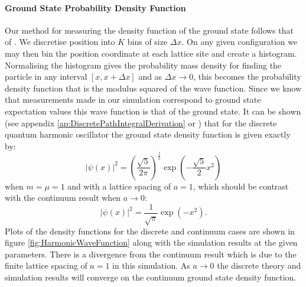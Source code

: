 \documentclass[12pt]{article}
\begin{document}
            \paragraph{Ground State Probability Density Function}
            Our method for measuring the density function of the ground state follows that of \cite{creutz_freedman_1981}. We discretise position into $K$ bins of size $\Delta x$. On any given configuration we may then bin the position coordinate at each lattice site and create a histogram. Normalising the histogram gives the probability mass density for finding the particle in any interval $\left[x,x+\Delta x\right]$ and as $\Delta x \rightarrow 0$, this becomes the probability density function that is the modulus squared of the wave function. Since we know that measurements made in our simulation correspond to ground state expectation values this wave function is that of the ground state. It can be shown (see appendix \ref{ap:DiscretePathIntegralDerivation} or \cite{creutz_freedman_1981}) that for the discrete quantum harmonic oscillator the ground state density function is given exactly by:
            \begin{equation}
                \label{eq:magSquaredWavefunction}
                |\psi\left(x\right)|^2=\left(\frac{\sqrt{5}}{2\pi}\right)^\frac{1}{2}\exp\left(-\frac{\sqrt{5}}{2}x^2\right)
            \end{equation}
            when $m=\mu=1$ and with a lattice spacing of $a=1$, which should be contrast with the continuum result when $a\rightarrow 0$:
            \begin{equation}
            |\psi\left(x\right)|^2 = \frac{1}{\sqrt{\pi}}\exp{\left(-x^2\right)}.
            \end{equation}
            Plots of the density functions for the discrete and continuum cases are shown in figure \ref{fig:HarmonicWaveFunction} along with the simulation results at the given parameters. There is a divergence from the continuum result which is due to the finite lattice spacing of $a=1$ in this simulation. As $a\rightarrow 0$ the discrete theory and simulation results will converge on the continuum ground state density function.
\end{document}
